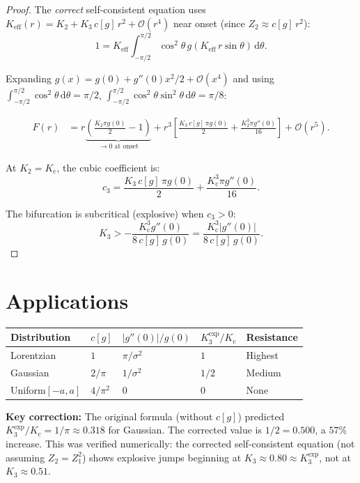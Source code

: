 \documentclass[11pt]{article}
\newcommand{\dd}{\mathrm{d}}
\newcommand{\Kc}{K_{\mathrm{c}}}
\begin{document}
\begin{proof}
  The \emph{correct} self-consistent equation uses
  $K_{\mathrm{eff}}(r) = K_2 + K_3\,c[g]\,r^2 + \mathcal{O}(r^4)$
  near onset (since $Z_2 \approx c[g]\,r^2$):
  \[
    1 = K_{\mathrm{eff}} \int_{-\pi/2}^{\pi/2}
    \cos^2\theta\, g(K_{\mathrm{eff}}\, r\sin\theta)\,\dd\theta.
  \]

  Expanding $g(x) = g(0) + g''(0)x^2/2 + \mathcal{O}(x^4)$ and using
  $\int_{-\pi/2}^{\pi/2}\cos^2\theta\,\dd\theta = \pi/2$,
  $\int_{-\pi/2}^{\pi/2}\cos^2\theta\sin^2\theta\,\dd\theta = \pi/8$:

  \begin{align}
    F(r) &= r\underbrace{\left(\frac{K_2\pi g(0)}{2} - 1\right)}_{\to 0\text{ at onset}}
    + r^3\left[\frac{K_3\,c[g]\,\pi g(0)}{2}
    + \frac{K_2^3\pi g''(0)}{16}\right]
    + \mathcal{O}(r^5).
  \end{align}

  At $K_2 = \Kc$, the cubic coefficient is:
  \[
    c_3 = \frac{K_3\,c[g]\,\pi g(0)}{2} + \frac{\Kc^3\pi g''(0)}{16}.
  \]

  The bifurcation is subcritical (explosive) when $c_3 > 0$:
  \[
    K_3 > -\frac{\Kc^3 g''(0)}{8\,c[g]\,g(0)}
    = \frac{\Kc^3 |g''(0)|}{8\,c[g]\,g(0)}.
  \]
\end{proof}

\section*{Applications}

\begin{tabular}{lllll}
  \textbf{Distribution} & $c[g]$ & $|g''(0)|/g(0)$ & $K_3^{\mathrm{exp}}/\Kc$ & \textbf{Resistance} \\
  \hline
  Lorentzian & $1$ & $\pi/\sigma^2$ & $1$ & Highest \\
  Gaussian & $2/\pi$ & $1/\sigma^2$ & $1/2$ & Medium \\
  Uniform$[-a,a]$ & $4/\pi^2$ & $0$ & $0$ & None \\
\end{tabular}

\medskip
\noindent\textbf{Key correction:} The original formula (without $c[g]$) predicted
$K_3^{\mathrm{exp}}/\Kc = 1/\pi \approx 0.318$ for Gaussian. The corrected value
is $1/2 = 0.500$, a $57\%$ increase. This was verified numerically:
the corrected self-consistent equation (not assuming $Z_2 = Z_1^2$)
shows explosive jumps beginning at $K_3 \approx 0.80 \approx K_3^{\mathrm{exp}}$,
not at $K_3 \approx 0.51$.
\end{document}
